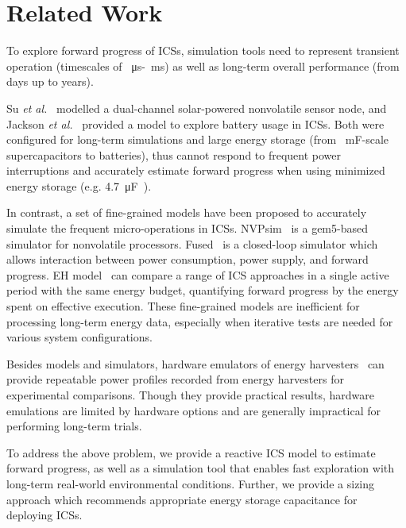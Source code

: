 \section{Related Work} \label{section:review2}

To explore forward progress of ICSs, simulation tools need to represent transient operation (timescales of \SI{}{\micro\second}-\SI{}{\milli\second}) as well as long-term overall performance (from days up to years). 

Su \textit{et al.}~\cite{Su:2019:TFR:3340300.3320270} modelled a dual-channel solar-powered nonvolatile sensor node, and Jackson \textit{et al.}~\cite{Jackson:2019:COC:3302506.3310400} provided a model to explore battery usage in ICSs. Both were configured for long-term simulations and large energy storage (from \SI{}{\milli\farad}-scale supercapacitors to batteries), thus cannot respond to frequent power interruptions and accurately estimate forward progress when using minimized energy storage (e.g. \SI{4.7}{\micro\farad}~\cite{10.1145/3281300}).

In contrast, a set of fine-grained models have been proposed to accurately simulate the frequent micro-operations in ICSs. 
NVPsim~\cite{7428003} is a gem5-based simulator for nonvolatile processors.
Fused~\cite{sliper2020fused} is a closed-loop simulator which allows interaction between power consumption, power supply, and forward progress. EH model~\cite{8574572} can compare a range of ICS approaches in a single active period with the same energy budget, quantifying forward progress by the energy spent on effective execution. These fine-grained models are inefficient for processing long-term energy data, especially when iterative tests are needed for various system configurations. 

Besides models and simulators, hardware emulators of energy harvesters~\cite{10.1145/2668332.2668336, 10.1145/3356250.3360042} can provide repeatable power profiles recorded from energy harvesters for experimental comparisons. Though they provide practical results, hardware emulations are limited by hardware options and are generally impractical for performing long-term trials.

To address the above problem, we provide a reactive ICS model to estimate forward progress, as well as a simulation tool that enables fast exploration with long-term real-world environmental conditions. Further, we provide a sizing approach which recommends appropriate energy storage capacitance for deploying ICSs. 